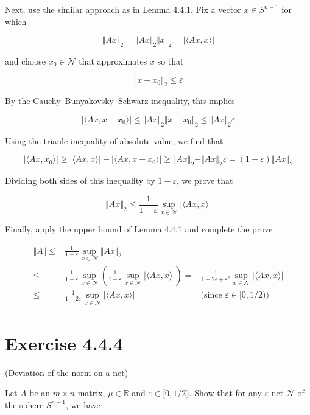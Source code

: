 \documentclass{article}
\begin{document}
Next, use the similar approach as in Lemma 4.4.1. Fix a vector $x \in S^{n-1}$ for which

$$\Vert Ax \Vert_2 = \Vert Ax \Vert_2 \Vert x \Vert_2 = |\langle Ax, x \rangle|$$

and choose $x_0 \in \mathcal N$ that approximates $x$ so that

$$\Vert x - x_0 \Vert_2 \leq \varepsilon$$

By the Cauchy–Bunyakovsky–Schwarz inequality, this implies

$$|\langle Ax, x - x_0 \rangle| \leq \Vert Ax \Vert_2 \Vert x - x_0 \Vert_2 \leq \Vert Ax \Vert_2 \varepsilon$$

Using the trianle inequality of absolute value, we find that

$$|\langle Ax, x_0 \rangle| \geq |\langle Ax, x \rangle| - |\langle Ax, x - x_0 \rangle| \geq \Vert Ax \Vert_2 - \Vert Ax \Vert_2 \varepsilon = (1 - \varepsilon) \Vert Ax \Vert_2$$

Dividing both sides of this inequality by $1 - \varepsilon$, we prove that

$$\Vert Ax \Vert_2 \leq \frac{1}{1-\varepsilon}\sup_{x \in \mathcal N}|\langle Ax, x \rangle|$$

Finally, apply the upper bound of Lemma 4.4.1 and complete the prove

\begin{equation*}
    \begin{aligned}
        \Vert A \Vert \leq & \frac{1}{1-\varepsilon}\sup_{x \in \mathcal N} \Vert Ax \Vert_2 \\ 
        \leq & \frac{1}{1-\varepsilon}\sup_{x \in \mathcal N} \left( \frac{1}{1-\varepsilon}\sup_{x \in \mathcal N}|\langle Ax, x \rangle|\right) = & \frac{1}{1-2\varepsilon+\varepsilon^2}\sup_{x \in \mathcal N}|\langle Ax, x \rangle| \\
        \leq & \frac{1}{1-2\varepsilon}\sup_{x \in \mathcal N}|\langle Ax, x \rangle| &\text{(since $\varepsilon \in [0,1/2)$)}
    \end{aligned}
\end{equation*}

\section{Exercise 4.4.4}
(Deviation of the norm on a net)

Let $A$ be an $m \times n$ matrix, $\mu \in \mathbb R$ and $\varepsilon \in [0,1/2)$. Show that for any $\varepsilon$-net $\mathcal N$ of the sphere $S^{n-1}$, we have
\end{document}
